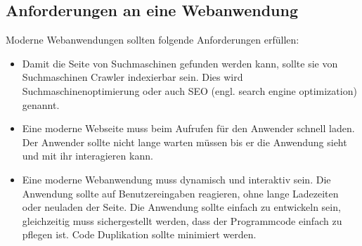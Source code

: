\documentclass[runningheads]{llncs}
\numberwithin{figure}{section}
\begin{document}
\subsection{Anforderungen an eine Webanwendung}
\label{subsec:Anforderungen an eine Webanwendung}

Moderne Webanwendungen sollten folgende Anforderungen erfüllen\cite{IsomorphicApps}:
\begin{itemize}
  \setlength\itemsep{1em}
  \item Damit die Seite von Suchmaschinen gefunden werden kann, sollte sie von Suchmaschinen Crawler indexierbar sein. 
  Dies wird Suchmaschinenoptimierung oder auch SEO 
  (engl. search engine optimization) genannt. 
  \item Eine moderne Webseite muss beim Aufrufen für den Anwender schnell laden. Der Anwender sollte nicht lange warten 
  müssen bis er die Anwendung sieht und mit ihr interagieren kann.
  \item Eine moderne Webanwendung muss dynamisch und interaktiv sein. Die Anwendung sollte auf Benutzereingaben reagieren, 
  ohne lange Ladezeiten oder neuladen der Seite.
  Die Anwendung sollte einfach zu entwickeln sein, gleichzeitig muss sichergestellt werden, 
  dass der Programmcode einfach zu pflegen ist. 
  Code Duplikation sollte minimiert werden.
\end{itemize}
\end{document}
